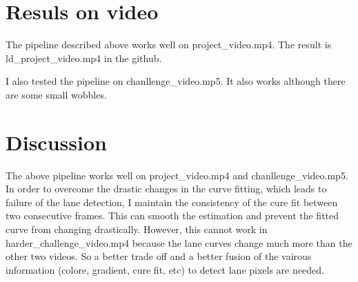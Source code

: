 \documentclass[12pt]{article}
\begin{document}
\section{Resuls on video}
The pipeline described above works well on project\_video.mp4. The result is ld\_project\_video.mp4 in the github.

I also tested the pipeline on chanllenge\_video.mp5. It also works although there are some small wobbles.


\section{Discussion}
The above pipeline works well on project\_video.mp4 and chanllenge\_video.mp5. In order to overcome the drastic changes in the curve fitting, which leads to failure of the lane detection, I maintain the consistency of the cure fit between two consecutive frames. This can smooth the estimation and prevent the fitted curve from changing drastically. However, this cannot work in harder\_challenge\_video.mp4 because the lane curves change much more than the other two videos. So a better trade off and a better fusion of the vairous information (colore, gradient, cure fit, etc) to detect lane pixels are needed. 
\end{document}
